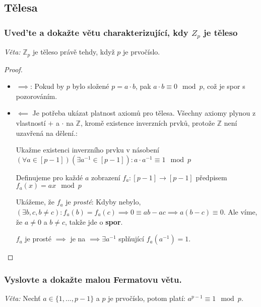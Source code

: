 \documentclass[10pt,a4paper]{article}
\begin{document}
\subsection{Tělesa}
\subsubsection{\texorpdfstring{Uved’te a dokažte větu charakterizující, kdy $Z_p$ je těleso}.}

\textit{Věta:} $\mathbb{Z}_p$ je těleso právě tehdy, když $p$ je prvočíslo.

\begin{proof}
$ $

\begin{itemize}
    \item $\implies$: Pokud by $p$ bylo složené $p = a\cdot b$, pak $a \cdot b \equiv 0 \mod p$, což je spor s pozorováním.

\item $\impliedby$
    Je potřeba ukázat platnost axiomů pro tělesa. Všechny axiomy plynou z vlastností $+$ a $\cdot$ na $\mathbb{Z}$, kromě existence inverzních prvků, protože $\mathbb{Z}$ není uzavřená na dělení.:

    Ukažme existenci inverzního prvku v násobení $(\forall a \in [p-1])(\exists a^{-1} \in [p-1]): a\cdot a^{-1} \equiv 1 \mod p$

    Definujeme pro každé $a$ zobrazení $f_a: [p-1] \to [p-1]$ předpisem $f_a(x) = ax \mod p$

    Ukážeme, že $f_a$ je \textit{prosté}: Kdyby nebylo, $(\exists b, c, b \neq c): f_a(b) = f_a(c) \implies 0 \equiv ab - ac \implies a(b-c) \equiv 0$. Ale víme, že $a \neq 0$ a $b \neq c$, takže jde o \textbf{spor}.

    

$f_a$ je prosté $\implies$ je na $\implies \exists a^{-1}$ splňující $f_a(a^{-1}) = 1$.

\end{itemize}
\end{proof}

\subsubsection{Vyslovte a dokažte malou Fermatovu větu.}

\textit{Věta:} Nechť $a \in \{1, ..., p-1\}$ a $p$ je prvočíslo, potom platí: $a^{p-1} \equiv 1 \mod p$.
\end{document}
